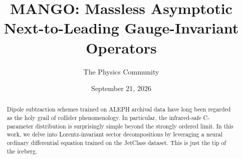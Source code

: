 \documentclass[11pt]{article}
\title{MANGO: Massless Asymptotic Next-to-Leading Gauge-Invariant Operators}
\author{The Physics Community}
\date{September 21, 2026}
\numberwithin{equation}{section}
\theoremstyle{definition}
\theoremstyle{remark}
\begin{document}
\maketitle
\begin{abstract}
Dipole subtraction schemes trained on ALEPH archival data have long been
regarded as the holy grail of collider phenomenology. In particular, the
infrared-safe C-parameter distribution is surprisingly simple beyond the
strongly ordered limit. In this work, we delve into Lorentz-invariant
sector decompositions by leveraging a neural ordinary differential
equation trained on the JetClass dataset. This is just the tip of the
iceberg.
\end{abstract}
\tableofcontents





\nocite{*}


\end{document}
